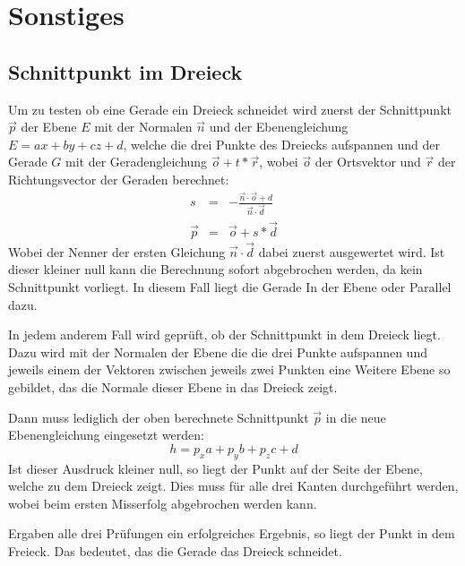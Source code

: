 \documentclass[final,a4paper,11pt,notitlepage,halfparskip]{scrreprt}
\begin{document}
\section{Sonstiges}
\subsection{Schnittpunkt im Dreieck}
Um zu testen ob eine Gerade ein Dreieck schneidet wird zuerst der Schnittpunkt
$\vec{p}$ der Ebene $E$ mit der Normalen $\vec{n}$ und der Ebenengleichung $E =
ax + by + cz + d$, welche die drei Punkte des Dreiecks aufspannen und der Gerade 
$G$ mit der Geradengleichung $\vec{o} + t*\vec{r}$, wobei $\vec{o}$ der 
Ortsvektor und $\vec{r}$ der Richtungsvector der Geraden berechnet:
\begin{eqnarray*}
    s       &=& -\frac{\vec{n} \cdot \vec{o} + d}{\vec{n} \cdot \vec{d}}\\
    \vec{p} &=& \vec{o} + s * \vec{d}
\end{eqnarray*}
Wobei der Nenner der ersten Gleichung $\vec{n} \cdot \vec{d}$ dabei zuerst
ausgewertet wird. Ist dieser kleiner null kann die Berechnung sofort abgebrochen
werden, da kein Schnittpunkt vorliegt. In diesem Fall liegt die Gerade In der
Ebene oder Parallel dazu.

In jedem anderem Fall wird geprüft, ob der Schnittpunkt in dem Dreieck liegt.
Dazu wird mit der Normalen der Ebene die die drei Punkte aufspannen und jeweils
einem der Vektoren zwischen jeweils zwei Punkten eine Weitere Ebene so gebildet,
das die Normale dieser Ebene in das Dreieck zeigt.

Dann muss lediglich der oben berechnete Schnittpunkt $\vec{p}$ in die neue
Ebenengleichung eingesetzt werden:
$$h = p_x a + p_y b + p_z c + d$$
Ist dieser Ausdruck kleiner null, so liegt der Punkt auf der Seite der Ebene,
welche zu dem Dreieck zeigt. Dies muss für alle drei Kanten durchgeführt werden,
wobei beim ersten Misserfolg abgebrochen werden kann.

Ergaben alle drei Prüfungen ein erfolgreiches Ergebnis, so liegt der Punkt in
dem Freieck. Das bedeutet, das die Gerade das Dreieck schneidet.
\end{document}
